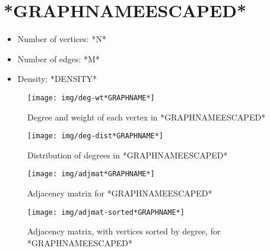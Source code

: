 \section{*GRAPHNAMEESCAPED*}

\begin{itemize}
    \item Number of vertices: *N*
    \item Number of edges: *M*
    \item Density: *DENSITY*
\end{itemize}

\begin{figure}[ht]
  \centering
  \texttt{[image: img/deg-wt*GRAPHNAME*]}
  \caption{Degree and weight of each vertex in *GRAPHNAMEESCAPED*}
\end{figure}

\begin{figure}[ht]
  \centering
  \texttt{[image: img/deg-dist*GRAPHNAME*]}
  \caption{Distribution of degrees in *GRAPHNAMEESCAPED*}
\end{figure}

\begin{figure}[ht]
  \centering
  \texttt{[image: img/adjmat*GRAPHNAME*]}
  \caption{Adjacency matrix for *GRAPHNAMEESCAPED*}
\end{figure}

\begin{figure}[ht]
  \centering
  \texttt{[image: img/adjmat-sorted*GRAPHNAME*]}
  \caption{Adjacency matrix, with vertices sorted by degree, for *GRAPHNAMEESCAPED*}
\end{figure}

\FloatBarrier

